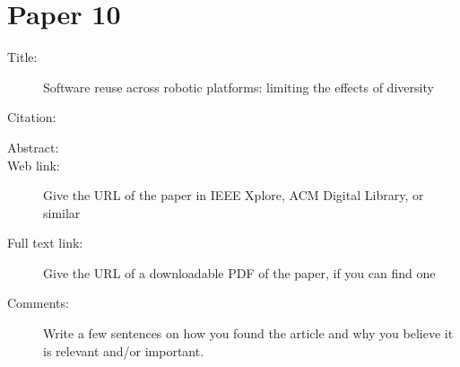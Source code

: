 \documentclass{scrartcl}
\begin{document}
\section*{Paper 10}
\begin{description}
\item[Title:] Software reuse across robotic platforms: limiting the effects of diversity
\item[Citation:] \cite{bibtex_key}
\item[Abstract:] 
\item[Web link:] Give the URL of the paper in IEEE Xplore, ACM Digital Library, or similar
\item[Full text link:] Give the URL of a downloadable PDF of the paper, if you can find one
\item[Comments:] Write a few sentences on how you found the article and why you believe it is relevant and/or important.
\end{description}




\end{document}
